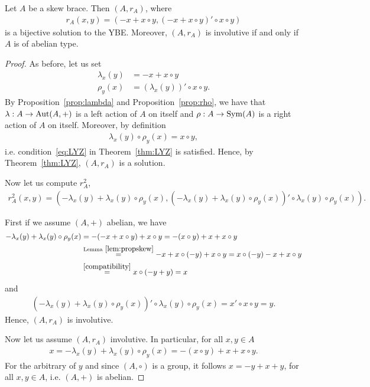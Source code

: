     \begin{theorem}
        Let $A$ be a skew brace. Then $(A,r_A)$, where 
        \begin{align*}
            r_A(x, y) = (-x + x\circ y, (-x + x \circ y)'\circ x\circ y)
        \end{align*}
        is a bijective solution to the YBE.
        Moreover, $(A, r_A)$ is involutive if and only if $A$ is of abelian type.
    \end{theorem}

    \begin{proof}
        As before, let us set 
        \begin{align*}
            \lambda_x(y)&=-x+x\circ y\\
            \rho_y(x) &= (\lambda_x(y))'\circ x \circ y.
        \end{align*}
        By Proposition~\ref{prop:lambda} and Proposition~\ref{prop:rho}, we have that 
        $\lambda: A \to \operatorname{Aut}(A,+)$ is a left action of $A$ on itself and $\rho: A\to \operatorname{Sym}(A)$ is a right action of $A$ on itself. Moreover, by definition
        \begin{align*}
            \lambda_x(y)\circ\rho_y(x)=x\circ y,
        \end{align*}
        i.e. condition~\eqref{eq:LYZ} in Theorem~\ref{thm:LYZ} is satisfied. 
        Hence, by Theorem~\ref{thm:LYZ}, $(A,r_A)$ is a solution.

        Now let us compute $r_A^2$,
        \begin{align*}
            r_A^2(x,y) = (-\lambda_x(y) + \lambda_x(y)\circ \rho_y(x), (-\lambda_x(y) + \lambda_x(y)\circ \rho_y(x))'\circ \lambda_x(y)\circ \rho_y(x)).
        \end{align*}

        First if we assume $(A,+)$ abelian, we have
        \begin{align*}
            -\lambda_x(y) + \lambda_x(y)\circ \rho_y(x) &= -(-x+x\circ y) + x\circ y
            = -(x\circ y) +x +x\circ y \\
            &\overset{\text{Lemma}~\ref{lem:propskew}}{=}
            - x + x\circ (-y) +x\circ y = x\circ (-y)-x +x\circ y \\
            &\overset{\eqref{compatibility}}{=} x\circ(-y+y) = x
        \end{align*}
        and
        \begin{align*}
            (-\lambda_x(y) + \lambda_x(y)\circ \rho_y(x))'\circ \lambda_x(y)\circ \rho_y(x)
            =x' \circ x\circ y = y.
        \end{align*}
        Hence, $(A,r_A)$ is involutive.

        Now let us assume $(A,r_A)$ involutive. In particular, for all $x,y\in A$
        \begin{align*}
            x= -\lambda_x(y) + \lambda_x(y)\circ \rho_y(x) = -(x\circ y) +x +x\circ y.
        \end{align*}
        For the arbitrary of $y$ and since $(A,\circ)$ is a group, it follows
        $x=-y+x+y$, for all $x,y \in A$, i.e. $(A,+)$ is abelian.        
    \end{proof}


